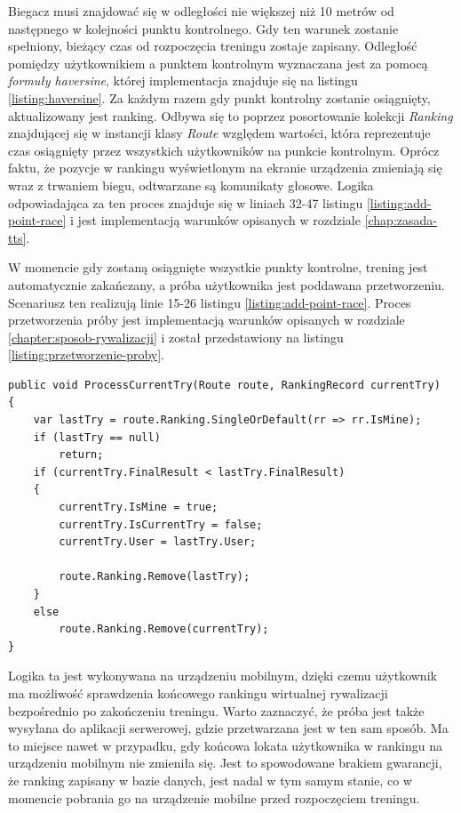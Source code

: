Biegacz musi znajdować się w odległości nie większej niż 10 metrów od następnego w kolejności punktu kontrolnego. Gdy ten warunek zostanie spełniony, bieżący czas od rozpoczęcia treningu zostaje zapisany. Odległość pomiędzy użytkownikiem a punktem kontrolnym wyznaczana jest za pomocą \textit{formuły haversine}, której implementacja znajduje się na listingu \ref{listing:haversine}. Za każdym razem gdy punkt kontrolny zostanie osiągnięty, aktualizowany jest ranking. Odbywa się to poprzez posortowanie kolekcji \textit{Ranking} znajdującej się w instancji klasy \textit{Route} względem wartości, która reprezentuje czas osiągnięty przez wszystkich użytkowników na punkcie kontrolnym. Oprócz faktu, że pozycje w rankingu wyświetlonym na ekranie urządzenia zmieniają się wraz z trwaniem biegu, odtwarzane są komunikaty głosowe. Logika odpowiadająca za ten proces znajduje się w liniach 32-47 listingu \ref{listing:add-point-race} i jest implementacją warunków opisanych w rozdziale \ref{chap:zasada-tts}.

W momencie gdy zostaną osiągnięte wszystkie punkty kontrolne, trening jest automatycznie zakańczany, a próba użytkownika jest poddawana przetworzeniu. Scenariusz ten realizują linie 15-26 listingu \ref{listing:add-point-race}. Proces przetworzenia próby jest implementacją warunków opisanych w rozdziale \ref{chapter:sposob-rywalizacji} i został przedstawiony na listingu \ref{listing:przetworzenie-proby}.
\begin{lstlisting}[caption={Przetworzenie próby użytkownika},label=listing:przetworzenie-proby]
public void ProcessCurrentTry(Route route, RankingRecord currentTry)
{
    var lastTry = route.Ranking.SingleOrDefault(rr => rr.IsMine);
    if (lastTry == null) 
        return;
    if (currentTry.FinalResult < lastTry.FinalResult)
    {
        currentTry.IsMine = true;
        currentTry.IsCurrentTry = false;
        currentTry.User = lastTry.User;

        route.Ranking.Remove(lastTry);
    }
    else
        route.Ranking.Remove(currentTry);
}
\end{lstlisting}
Logika ta jest wykonywana na urządzeniu mobilnym, dzięki czemu użytkownik ma możliwość sprawdzenia końcowego rankingu wirtualnej rywalizacji bezpośrednio po zakończeniu treningu. Warto zaznaczyć, że próba jest także wysyłana do aplikacji serwerowej, gdzie przetwarzana jest w ten sam sposób. Ma to miejsce nawet w przypadku, gdy końcowa lokata użytkownika w rankingu na urządzeniu mobilnym nie zmieniła się. Jest to spowodowane brakiem gwarancji, że ranking zapisany w bazie danych, jest nadal w tym samym stanie, co w momencie pobrania go na urządzenie mobilne przed rozpoczęciem treningu.

